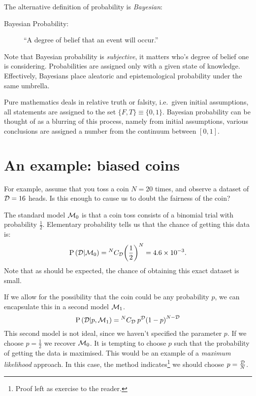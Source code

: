 The alternative definition of probability is {\em Bayesian\/}:
\begin{description}
  \item[Bayesian Probability:] ``A degree of belief that an event will occur.'' 
\end{description}
Note that Bayesian probability is {\em subjective}, it matters who's degree of belief one is considering. Probabilities are assigned only with a given state of knowledge. Effectively, Bayesians place aleatoric and epistemological probability under the same umbrella. 

Pure mathematics deals in relative truth or falsity, i.e.\ given initial assumptions, all statements are assigned to the set $\{F,T\}\equiv\{0,1\}$. Bayesian probability can be thought of as a blurring of this process, namely from initial assumptions, various conclusions are assigned a number from the continuum between $[0,1]$.

\section{An example: biased coins}
For example, assume that you toss a coin $N=20$ times, and observe a dataset of $\mathcal{D} = 16$ heads. Is this enough to cause us to doubt the fairness of the coin?

The standard model $\mathcal{M}_0$ is that a coin toss consists of a binomial trial with probability $\frac{1}{2}$. Elementary probability tells us that the chance of getting this data is:
\begin{equation}
  \mathrm{P}\left(\mathcal{D}\middle|\mathcal{M}_0\right)= {^{N}C_{\mathcal{D}}} {\left( \frac{1}{2} \right)}^{N}  = 4.6\times 10^{-3}.
  \label{eqn:bay:M0}
\end{equation}
Note that as should be expected, the chance of obtaining this exact dataset is small. 

If we allow for the possibility that the coin could be any probability $p$, we can encapsulate this in a second model $\mathcal{M}_1$.
\begin{equation}
  \mathrm{P}\left(\mathcal{D}\middle|p,\mathcal{M}_1\right)= {^{N}C_{\mathcal{D}}}\: {p}^{\mathcal{D}} {\left(1 - p \right)}^{N-\mathcal{D}} 
  \label{eqn:bay:M1}
\end{equation}
This second model is not ideal, since we haven't specified the parameter $p$. If we choose $p=\frac{1}{2}$ we recover $\mathcal{M}_0$. It is tempting to choose $p$ such that the probability of getting the data is maximised. This would be an example of a {\em maximum likelihood\/} approach. In this case, the method indicates\footnote{Proof left as exercise to the reader.} we should choose $p = \frac{\mathcal{D}}{N}$. 

